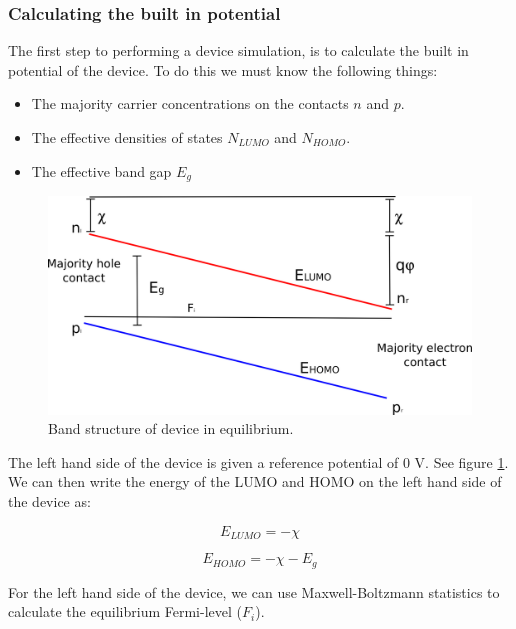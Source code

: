 \documentclass[11pt]{article}
\begin{document}
\subsubsection{Calculating the built in potential}  \label{sssec:initial}
The first step to performing a device simulation, is to calculate the built in potential of the device.  To do this we must know the following things:

\begin{itemize}

  \item The majority carrier concentrations on the contacts $n$ and $p$.
  \item The effective densities of states $N_{LUMO}$ and $N_{HOMO}$.
  \item The effective band gap $E_g$

\end{itemize}

\begin{figure}[ht!]
\centering
\includegraphics[width=120mm]{./images/bands.png}
\caption{Band structure of device in equilibrium.}
\label{fig:bands}
\end{figure}

\vspace{1em}
The left hand side of the device is given a reference potential of 0 V.  See figure \ref{fig:bands}.  We can then write the energy of the LUMO and HOMO on the left hand side of the device as:

\begin{equation}
E_{LUMO}=-\chi
\end{equation}

\begin{equation}
E_{HOMO}=-\chi-E_{g}
\end{equation}

For the left hand side of the device, we can use Maxwell-Boltzmann statistics to calculate the equilibrium Fermi-level ($F_i$).
\end{document}
